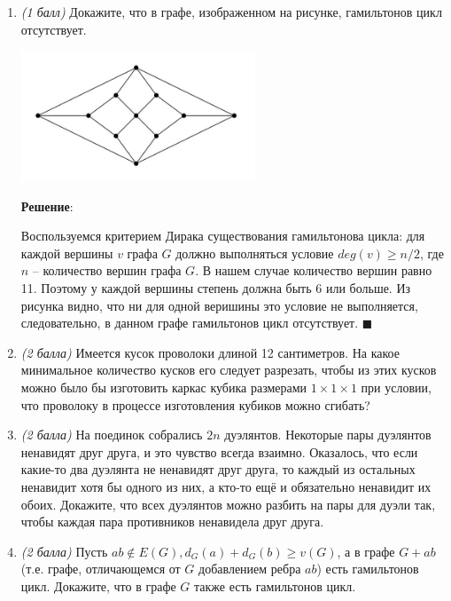 \documentclass{article}
\begin{document}
\begin{enumerate}
    \item \textit{(1 балл)} Докажите, что в графе, изображенном на рисунке, гамильтонов цикл отсутствует.
    \begin{center}
        \includegraphics[width=7cm]{images/2.3.png}
    \end{center}

    \textbf{Решение}:

    Воспользуемся критерием Дирака существования гамильтонова цикла: для каждой вершины $v$ графа $G$ должно выполняться условие $deg(v) \geq n/2$, где $n$ -- количество вершин графа $G$. В нашем случае количество вершин равно 11. Поэтому у каждой вершины степень должна быть 6 или больше. Из рисунка видно, что ни для одной веришины это условие не выполняется, следовательно, в данном графе гамильтонов цикл отсутствует. $\blacksquare$
    
    \item \textit{(2 балла)} Имеется кусок проволоки длиной 12 сантиметров. На какое минимальное количество кусков его следует
    разрезать, чтобы из этих кусков можно было бы изготовить каркас кубика размерами $1\times1\times1$ при условии, что проволоку в процессе изготовления кубиков можно сгибать?
    
    \item \textit{(2 балла)} На поединок собрались $2n$ дуэлянтов. Некоторые пары дуэлянтов ненавидят друг друга, и это чувство всегда взаимно. Оказалось, что если какие-то два дуэлянта не ненавидят друг друга, то каждый из остальных ненавидит хотя бы одного из них, а кто-то ещё и обязательно ненавидит их обоих. Докажите, что всех дуэлянтов можно разбить на пары для дуэли так, чтобы каждая пара противников ненавидела друг друга.
    
    \item \textit{(2 балла)} Пусть $ab\notin E(G), d_G(a) + d_G(b)\geq v(G)$, а в графе $G + ab$ (т.е. графе, отличающемся от $G$ добавлением ребра $ab$) есть гамильтонов цикл. Докажите, что в графе $G$ также есть гамильтонов цикл.
    
\end{enumerate}
\end{document}
